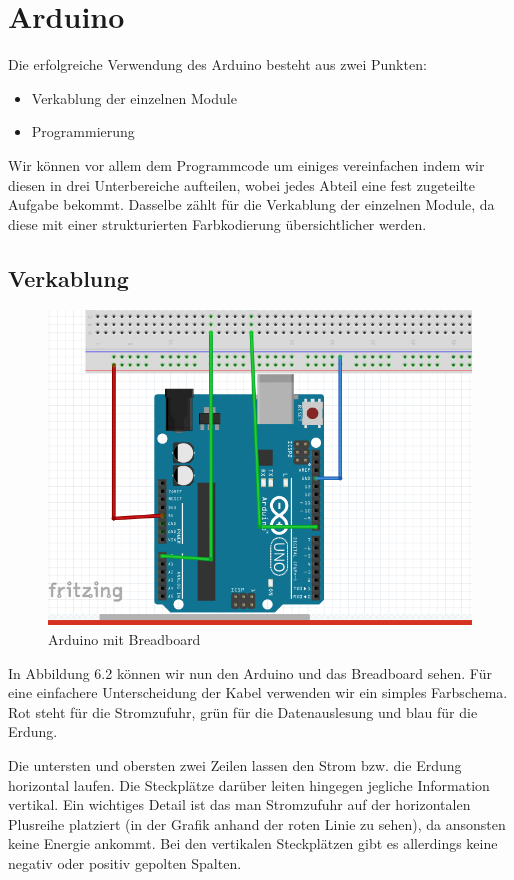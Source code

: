 \newpage
\def \currentAuthor{Kevin Glatz}

\section{Arduino}

Die erfolgreiche Verwendung des Arduino besteht aus zwei  Punkten:
\begin{itemize}
	\item Verkablung der einzelnen Module 
	\item Programmierung
\end{itemize}

Wir können vor allem dem Programmcode um einiges vereinfachen indem wir diesen in drei Unterbereiche aufteilen, wobei jedes Abteil eine fest zugeteilte Aufgabe bekommt. Dasselbe zählt für die Verkablung der einzelnen Module, da diese mit einer strukturierten Farbkodierung übersichtlicher werden.


\subsection{Verkablung}
\begin{figure}[h]
	
	\includegraphics[width=0.7\linewidth]{figures/VerkablungStrukturplan.png}
	\caption{Arduino mit Breadboard}
	\label{fig:verkablungstrukturplan}
\end{figure}

In Abbildung 6.2 können wir nun den Arduino und das Breadboard sehen.  Für eine einfachere Unterscheidung der Kabel verwenden wir ein simples Farbschema. Rot steht für die Stromzufuhr, grün für die Datenauslesung und blau für die Erdung.


Die untersten und obersten zwei Zeilen lassen den Strom bzw. die Erdung horizontal laufen.  Die Steckplätze darüber leiten hingegen jegliche Information vertikal. Ein wichtiges Detail ist das man Stromzufuhr auf der horizontalen Plusreihe platziert (in der Grafik anhand der roten Linie zu sehen), da ansonsten keine Energie ankommt. Bei den vertikalen Steckplätzen gibt es allerdings keine negativ oder positiv gepolten Spalten.

